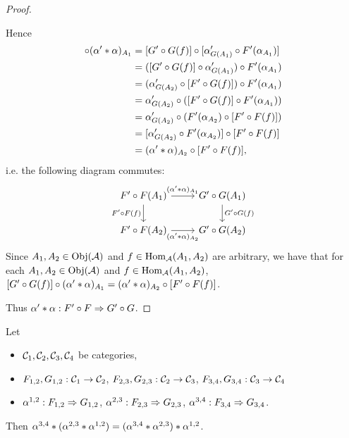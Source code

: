 \documentclass{book}
\begin{document}
\begin{proof}
\begin{enumerate}
			Hence 
			\begin{align*}
				[G' \circ G(f)] \circ (\al' * \al)_{A_1}
				& = [G' \circ G(f)] \circ [\al'_{G(A_1)} \circ F'(\al_{A_1})] \\
				& = ([G' \circ G(f)] \circ \al'_{G(A_1)}) \circ F'(\al_{A_1}) \\
				& = (\al'_{G(A_2)} \circ [F' \circ G(f)]) \circ F'(\al_{A_1}) \\
				& = \al'_{G(A_2)} \circ ([F' \circ G(f)] \circ F'(\al_{A_1})) \\
				& = \al'_{G(A_2)} \circ (F'(\al_{A_2}) \circ [F' \circ F(f)]) \\
				& = [\al'_{G(A_2)} \circ F'(\al_{A_2})] \circ [F' \circ F(f)] \\
				& = (\al' * \al)_{A_2} \circ [F' \circ F(f)],
			\end{align*}
			i.e. the following diagram commutes:
			\[ 
			\begin{tikzcd}
				F' \circ F(A_1)  \arrow[r, "(\al' * \al)_{A_1}"]  \arrow[d, "F' \circ F(f)"']  & G' \circ G(A_1)   \arrow[d, "G' \circ G(f)"]\\
				F' \circ F(A_2) \arrow[r, "(\al' * \al)_{A_2}"'] &  G' \circ G(A_2) 
			\end{tikzcd}
			\]
			Since $A_1, A_2 \in \operatorname{Obj}(\mathcal{A})$ and $f \in \operatorname{Hom}_{\mathcal{A}}(A_1, A_2)$ are arbitrary, we have that for each $A_1, A_2 \in \operatorname{Obj}(\mathcal{A})$ and $f \in \operatorname{Hom}_{\mathcal{A}}(A_1, A_2)$, $[G' \circ G(f)] \circ (\alpha' * \alpha)_{A_1} = (\alpha' * \alpha)_{A_2} \circ [F' \circ F(f)]$.
		\end{enumerate}
		Thus $\alpha' * \alpha: F' \circ F \Rightarrow G' \circ G$.
	\end{proof}
	
	\begin{ex}
		Let  
		\begin{itemize}
			\item $\mathcal{C}_1, \mathcal{C}_2, \mathcal{C}_3, \mathcal{C}_4$ be categories, 
			\item $F_{1,2}, G_{1,2}: \mathcal{C}_1 \rightarrow \mathcal{C}_2$, $F_{2,3}, G_{2,3}: \mathcal{C}_2 \rightarrow \mathcal{C}_3$, $F_{3,4}, G_{3,4}: \mathcal{C}_3 \rightarrow \mathcal{C}_4$ 
			\item $\alpha^{1,2}:F_{1,2} \Rightarrow G_{1,2}$, $\alpha^{2,3}:F_{2,3} \Rightarrow G_{2,3}$, $\alpha^{3,4}:F_{3,4} \Rightarrow G_{3,4}$.
		\end{itemize}
		Then $\alpha^{3,4} * (\alpha^{2,3} * \alpha^{1,2}) = (\alpha^{3,4} * \alpha^{2,3}) * \alpha^{1,2}$.
	\end{ex}
	
\end{document}
